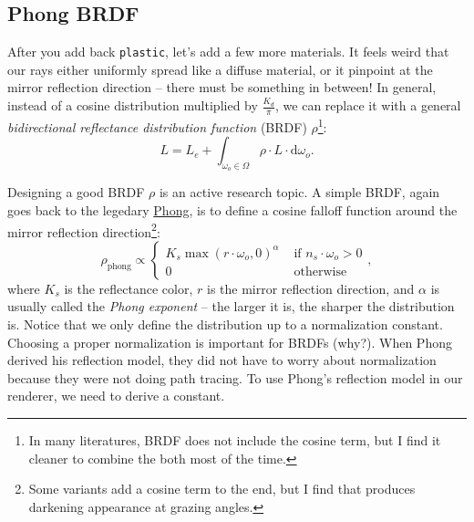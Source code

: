 \subsection{Phong BRDF}
After you add back \lstinline{plastic}, let's add a few more materials. It feels weird that our rays either uniformly spread like a diffuse material, or it pinpoint at the mirror reflection direction -- there must be something in between! In general, instead of a cosine distribution multiplied by $\frac{K_d}{\pi}$, we can replace it with a general \emph{bidirectional reflectance distribution function} (BRDF) $\rho$\footnote{In many literatures, BRDF does not include the cosine term, but I find it cleaner to combine the both most of the time.}:
\begin{equation}
L = L_e + \int_{\omega_o \in \Omega} \rho \cdot L \cdot \mathrm{d}\omega_o.
\label{eq:rendering_equation}
\end{equation}

Designing a good BRDF $\rho$ is an active research topic. A simple BRDF, again goes back to the legedary \href{https://en.wikipedia.org/wiki/Phong_reflection_model}{Phong}, is to define a cosine falloff function around the mirror reflection direction\footnote{Some variants add a cosine term to the end, but I find that produces darkening appearance at grazing angles.}:
\begin{equation}
\rho_{\text{phong}} \propto \begin{cases}
K_s \max\left(r \cdot \omega_o, 0\right)^\alpha & \text{ if } n_s \cdot \omega_o > 0 \\
0 & \text{ otherwise} 
\end{cases},
\end{equation}
where $K_s$ is the reflectance color, $r$ is the mirror reflection direction, and $\alpha$ is usually called the \emph{Phong exponent} -- the larger it is, the sharper the distribution is. Notice that we only define the distribution up to a normalization constant. Choosing a proper normalization is important for BRDFs (why?). When Phong derived his reflection model, they did not have to worry about normalization because they were not doing path tracing. To use Phong's reflection model in our renderer, we need to derive a constant.


